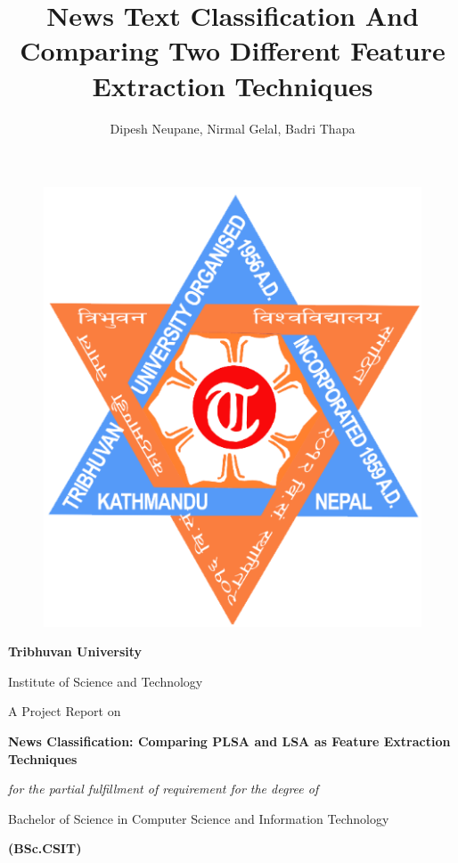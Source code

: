 \documentclass[12pt]{report}
\title{News Text Classification And Comparing Two Different Feature Extraction Techniques}
\author{Dipesh Neupane, Nirmal Gelal, Badri Thapa}
\begin{document}
    \begin{center}

        \begin{figure}
            \centering
            \includegraphics[scale=0.3]{tulogo.png}
        \end{figure}
    \vskip 1in
    \begin{Huge}
    \textbf{Tribhuvan University}

    Institute of Science and Technology\\[0.5in]
    \end{Huge}




    \begin{Large}
    A Project Report on

    \textbf{News Classification: Comparing PLSA and LSA as Feature Extraction Techniques}\\[0.5in]
    \end{Large}
    \emph{for the partial fulfillment of requirement for the degree of}


    \begin{large}Bachelor of Science in Computer Science and Information Technology

    \textbf{(BSc.CSIT)}\\[0.5in]
    \end{large}


\end{center}
\end{document}
